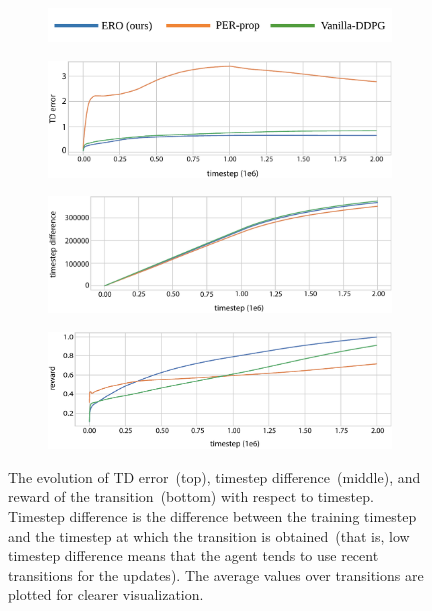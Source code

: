 \documentclass{article}
\begin{document}
\begin{figure}[t]
  \centering
  \begin{subfigure}[b]{0.4\textwidth}
    \includegraphics[width=1.0\textwidth]{legend2.pdf}
  \end{subfigure}
  \vspace{5pt}
  
  \begin{subfigure}[b]{0.45\textwidth}
    \includegraphics[width=\textwidth]{td.pdf}
  \end{subfigure}%
  
  \begin{subfigure}[b]{0.45\textwidth}
    \includegraphics[width=\textwidth]{timestep.pdf}
  \end{subfigure}%
  
  \begin{subfigure}[b]{0.45\textwidth}
    \includegraphics[width=\textwidth]{reward.pdf}
  \end{subfigure}%
  
  \caption{The evolution of TD error~(top), timestep difference~(middle), and reward of the transition~(bottom) with respect to timestep. Timestep difference is the difference between the training timestep and the timestep at which the transition is obtained~(that is, low timestep difference means that the agent tends to use recent transitions for the updates). The average values over transitions are plotted for clearer visualization.}
  \label{label:transition}
\end{figure}
\end{document}
